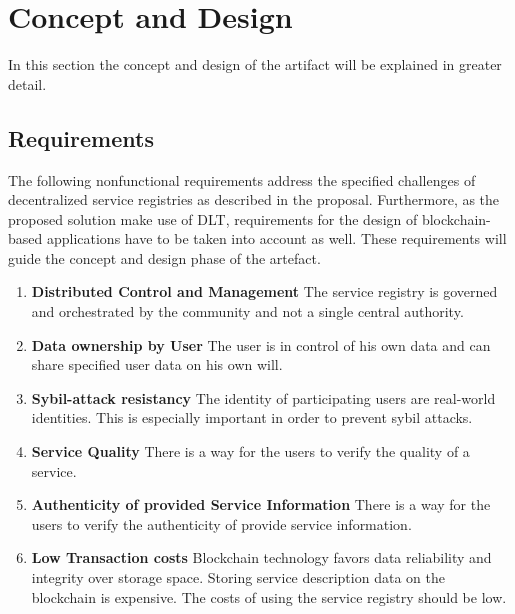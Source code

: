 \chapter{Concept and Design}
\label{cha:conceptanddesign}

In this section the concept and design of the artifact will be explained in greater detail.

\section{Requirements}

The following nonfunctional requirements address the specified challenges of decentralized service registries as described in the proposal. 
Furthermore, as the proposed solution make use of DLT, requirements for the design of blockchain-based applications have to be taken into account as well. These requirements will guide the concept and design phase of the artefact. 

\begin{enumerate}
    \item \textbf{Distributed Control and Management}
    The service registry is governed and orchestrated by the community and not a single central authority. 
  
    \item \textbf{Data ownership by User}
    The user is in control of his own data and can share specified user data on his own will. 
  
    \item \textbf{Sybil-attack resistancy}
    The identity of participating users are real-world identities. This is especially important in order to prevent sybil attacks. 
  
    \item \textbf{Service Quality}
    There is a way for the users to verify the quality of a service. 
  
    \item \textbf{Authenticity of provided Service Information}
    There is a way for the users to verify the authenticity of provide service information. 
  
    \item \textbf{Low Transaction costs}
    Blockchain technology favors data reliability and integrity over storage space. Storing service description data on the blockchain is expensive. 
    The costs of using the service registry should be low. 
  
  \end{enumerate}

